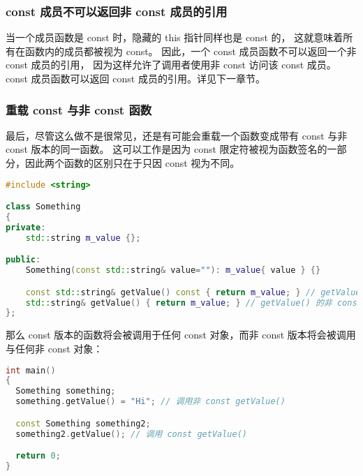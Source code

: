 \documentclass[../../LearnCpp.tex]{subfiles}
\begin{document}
\subsubsection*{const 成员不可以返回非 const 成员的引用}

当一个成员函数是 const 时，隐藏的 \*this 指针同样也是 const 的，
这就意味着所有在函数内的成员都被视为 const。
因此，一个 const 成员函数不可以返回一个非 const 成员的引用，
因为这样允许了调用者使用非 const 访问该 const 成员。
const 成员函数可以返回 const 成员的引用。详见下一章节。

\subsubsection*{重载 const 与非 const 函数}

最后，尽管这么做不是很常见，还是有可能会重载一个函数变成带有 const 与非 const 版本的同一函数。
这可以工作是因为 const 限定符被视为函数签名的一部分，因此两个函数的区别只在于只因 const 视为不同。

\begin{lstlisting}[language=C++]
#include <string>

class Something
{
private:
    std::string m_value {};

public:
    Something(const std::string& value=""): m_value{ value } {}

    const std::string& getValue() const { return m_value; } // getValue() 的 const 对象（返回 const 引用）
    std::string& getValue() { return m_value; } // getValue() 的非 const 对象（返回非 const 引用）
};
\end{lstlisting}

那么 const 版本的函数将会被调用于任何 const 对象，而非 const 版本将会被调用与任何非 const 对象：

\begin{lstlisting}[language=C++]
int main()
{
  Something something;
  something.getValue() = "Hi"; // 调用非 const getValue()

  const Something something2;
  something2.getValue(); // 调用 const getValue()

  return 0;
}
\end{lstlisting}
\end{document}
